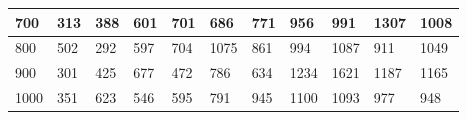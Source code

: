 \documentclass[10pt,letterpaper]{article}
\begin{document}
\begin{center}
\begin{table}
\begin{tabular} { |m{0.5cm}|m{1.3cm}|m{1.3cm}|m{1.3cm}|m{1.3cm}|m{1.3cm}|m{1.3cm}|m{1.3cm}|m{1.3cm}|m{1.3cm}|m{1.3cm}|}
\hline
\cellcolor{Gray}700 & \Large 313 & \Large 388 & \Large 601 & \Large 701 & \Large 686 & \Large 771 & \Large 956 & \Large 991 & \Large 1307 & \Large 1008 \\
\hline
\cellcolor{Gray}800 & \Large 502 & \Large 292 & \Large 597 & \Large 704 & \Large 1075 & \Large 861 & \Large 994 & \Large 1087 & \Large 911 & \Large 1049 \\
\hline
\cellcolor{Gray}900 & \Large 301 & \Large 425 & \Large 677 & \Large 472 & \Large 786 & \Large 634 & \Large 1234 & \Large 1621 & \Large 1187 & \Large 1165 \\
\hline
\cellcolor{Gray}1000 & \Large 351 & \Large 623 & \Large 546 & \Large 595 & \Large 791 & \Large 945 & \Large 1100 & \Large 1093 & \Large 977 & \Large 948 \\
\hline
\end{tabular} \\
\end{table}
\end{center}
\newpage 
{}
\end{document}
